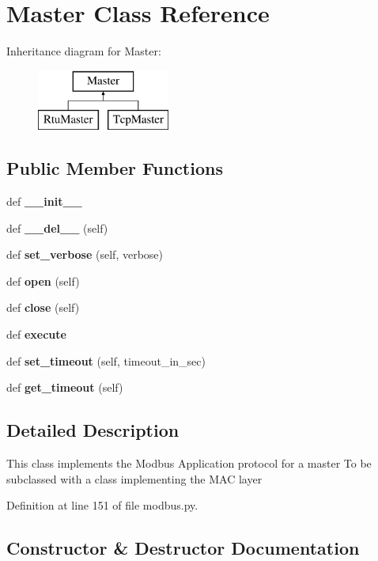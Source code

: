 \section{Master Class Reference}
\label{classprotolibs_1_1modbus__tk_1_1modbus_1_1_master}
Inheritance diagram for Master\+:\begin{figure}[H]
\begin{center}
\leavevmode
\includegraphics[height=2.000000cm]{classprotolibs_1_1modbus__tk_1_1modbus_1_1_master}
\end{center}
\end{figure}
\subsection*{Public Member Functions}
\begin{DoxyCompactItemize}
\item 
def {\bf \+\_\+\+\_\+init\+\_\+\+\_\+}
\item 
def {\bf \+\_\+\+\_\+del\+\_\+\+\_\+} (self)
\item 
def {\bf set\+\_\+verbose} (self, verbose)
\item 
def {\bf open} (self)
\item 
def {\bf close} (self)
\item 
def {\bf execute}
\item 
def {\bf set\+\_\+timeout} (self, timeout\+\_\+in\+\_\+sec)
\item 
def {\bf get\+\_\+timeout} (self)
\end{DoxyCompactItemize}


\subsection{Detailed Description}
\begin{DoxyVerb}This class implements the Modbus Application protocol for a master
To be subclassed with a class implementing the MAC layer
\end{DoxyVerb}
 

Definition at line 151 of file modbus.\+py.



\subsection{Constructor \& Destructor Documentation}

